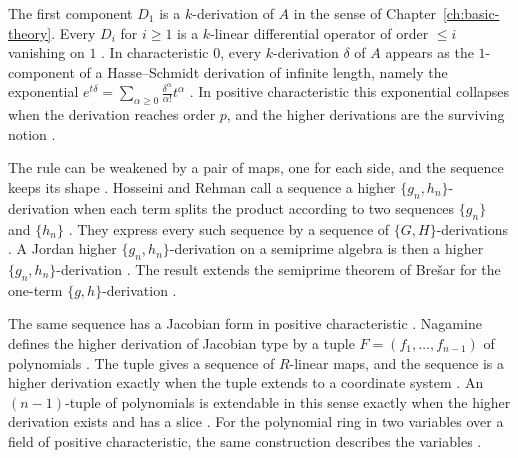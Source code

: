 The first component $D_1$ is a $k$-derivation of $A$ in the sense of
Chapter~\ref{ch:basic-theory}. Every $D_i$ for $i\geq 1$ is a $k$-linear
differential operator of order $\leq i$ vanishing on $1$
\cite[p.~1]{NarvaezMacarro2020}. In characteristic $0$, every $k$-derivation
$\delta$ of $A$ appears as the $1$-component of a Hasse--Schmidt derivation of
infinite length, namely the exponential $e^{t\delta}=\sum_{\alpha\geq0}
\frac{\delta^\alpha}{\alpha!}t^\alpha$ \cite[p.~2]{NarvaezMacarro2020}. In
positive characteristic this exponential collapses when the derivation reaches
order $p$, and the higher derivations are the surviving notion \cite[p.~2]{NarvaezMacarro2020}.

The rule can be weakened by a pair of maps, one for each side, and the sequence
keeps its shape \cite[Definition~2.1, p.~3]{HosseiniRehman2019Higher}. Hosseini
and Rehman call a sequence a higher
$\{g_n,h_n\}$-derivation when each term splits the product according to two
sequences $\{g_n\}$ and $\{h_n\}$ \cite[Definition~2.1, p.~3]{HosseiniRehman2019Higher}.
They express every such sequence by a sequence of $\{G,H\}$-derivations
\cite[Theorem~2.4, p.~7]{HosseiniRehman2019Higher}. A Jordan higher
$\{g_n,h_n\}$-derivation on a semiprime algebra is then a higher
$\{g_n,h_n\}$-derivation \cite[Corollary~2.6, p.~12]{HosseiniRehman2019Higher}.
The result extends the semiprime theorem of Brešar for the one-term
$\{g,h\}$-derivation \cite[p.~1]{HosseiniRehman2019Higher}.

The same sequence has a Jacobian form in positive characteristic
\cite[p.~1]{Nagamine2019HigherJacobian}. Nagamine defines the higher derivation of
Jacobian type by a tuple $F=(f_1,\dots,f_{n-1})$ of polynomials
\cite[Definition~2.4, p.~3]{Nagamine2019HigherJacobian}. The tuple gives a sequence
of $R$-linear maps, and the sequence is a higher derivation exactly when the
tuple extends to a coordinate system
\cite[Definition~2.4, p.~3]{Nagamine2019HigherJacobian}. An $(n-1)$-tuple of
polynomials is extendable in this sense exactly when the higher derivation
exists and has a slice \cite[Theorem~2.8, p.~5]{Nagamine2019HigherJacobian}. For the
polynomial ring in two variables over a field of positive characteristic, the
same construction describes the variables \cite[Theorem~3.1, p.~6]{Nagamine2019HigherJacobian}.

